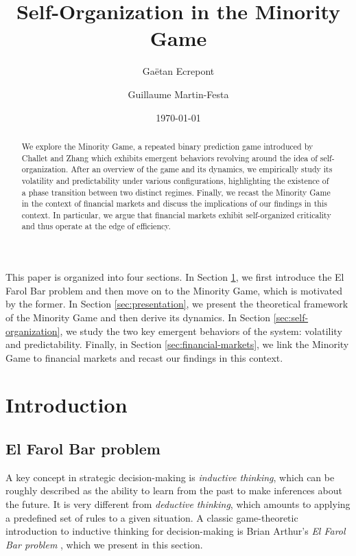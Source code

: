 \documentclass[a4paper, amsfonts, amssymb, amsmath, reprint, showkeys, nofootinbib, twoside]{revtex4-1}
\begin{document}
\title{Self-Organization in the Minority Game}

\author{Gaëtan Ecrepont}
\author{Guillaume Martin-Festa}

\date{\today} %

\begin{abstract}
    We explore the Minority Game, a repeated binary prediction game introduced by Challet and Zhang which exhibits emergent behaviors revolving around the idea of self-organization. After an overview of the game and its dynamics, we empirically study its volatility and predictability under various configurations, highlighting the existence of a phase transition between two distinct regimes. Finally, we recast the Minority Game in the context of financial markets and discuss the implications of our findings in this context. In particular, we argue that financial markets exhibit self-organized criticality and thus operate at the edge of efficiency.
\end{abstract}


\maketitle

This paper is organized into four sections. In Section \ref{sec:introduction}, we first introduce the El Farol Bar problem and then move on to the Minority Game, which is motivated by the former. In Section \ref{sec:presentation}, we present the theoretical framework of the Minority Game and then derive its dynamics. In Section \ref{sec:self-organization}, we study the two key emergent behaviors of the system: volatility and predictability. Finally, in Section \ref{sec:financial-markets}, we link the Minority Game to financial markets and recast our findings in this context.


\section{Introduction}
\label{sec:introduction}

\subsection{El Farol Bar problem}
A key concept in strategic decision-making is \textit{inductive thinking}, which can be roughly described as the ability to learn from the past to make inferences about the future. It is very different from \textit{deductive thinking}, which amounts to applying a predefined set of rules to a given situation. A classic game-theoretic introduction to inductive thinking for decision-making is Brian Arthur's \textit{El Farol Bar problem} \cite{Arthur_1994}, which we present in this section.
\end{document}
